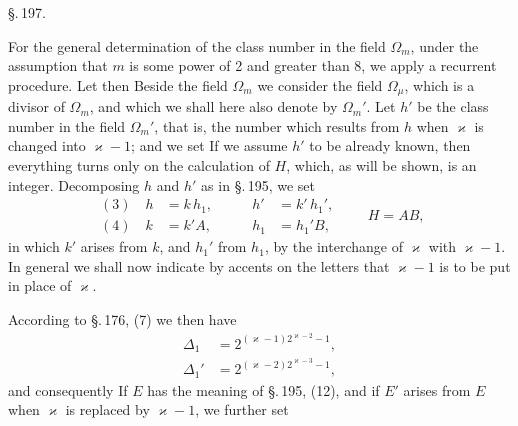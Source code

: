 

\begin{center}
\S.\,197.

\end{center}

For the general determination of the class number in the field $\Omega_m$,
under the assumption that $m$ is some power of 2 and greater than 8, we
apply a recurrent procedure. Let then
Beside the field $\Omega_m$ we consider the field $\Omega_\mu$, which is a
divisor of $\Omega_m$, and which we shall here also denote by $\Omega_m'$.
Let $h'$ be the class number in the field $\Omega_m'$, that is, the number
which results from $h$ when $\varkappa$ is changed into $\varkappa - 1$;
and we set
If we assume $h'$ to be already known, then everything turns only on the
calculation of $H$, which, as will be shown, is an integer. Decomposing
$h$ and $h'$ as in \S.\,195, we set
\[
\begin{aligned}
(3)\quad h &= k\,h_1, & \qquad h' &= k'\,h_1', \\
(4)\quad k &= k'A, & \qquad h_1 &= h_1'B,
\end{aligned}
\qquad H = AB,
\]
in which $k'$ arises from $k$, and $h_1'$ from $h_1$, by the interchange of
$\varkappa$ with $\varkappa - 1$. In general we shall now indicate by
accents on the letters that $\varkappa - 1$ is to be put in place of
$\varkappa$.

According to \S.\,176, (7) we then have
\[
\begin{aligned}
\Delta_1 &= 2^{(\varkappa-1)2^{\varkappa-2}-1}, \\
\Delta_1' &= 2^{(\varkappa-2)2^{\varkappa-3}-1},
\end{aligned}
\]
and consequently
If $E$ has the meaning of \S.\,195, (12), and if $E'$ arises from $E$ when
$\varkappa$ is replaced by $\varkappa - 1$, we further set
